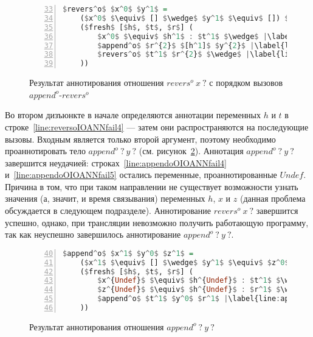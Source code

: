 \begin{figure}[h!]
  \begin{center}
  \begin{minipage}{0.35\textwidth}
  \begin{lstlisting}[language=Haskell, frame=single, numbers=left,numberstyle=\small, firstnumber=33, escapechar=|]
  $revers^o$ $x^0$ $y^1$ =
    ($x^0$ $\equiv$ [] $\wedge$ $y^1$ $\equiv$ []) $\vee$ |\label{line:reversoIOANNfail2}|
    ($fresh$ [$h$, $t$, $r$] (
        $x^0$ $\equiv$ $h^1$ : $t^1$ $\wedge$ |\label{line:reversoIOANNfail4}|
        $append^o$ $r^{2}$ $[h^1]$ $y^{2}$ |\label{line:reversoIOANNfail5}|
        $revers^o$ $t^1$ $r^{2}$ $\wedge$ |\label{line:reversoIOANNfail6}|
    ))
    \end{lstlisting}
  \end{minipage}
  \end{center}
  \caption{Результат аннотирования отношения $revers^o \ x \ ?$ с порядком вызовов $append^o$-$revers^o$}
  \label{lst:reversoIOANNfail}
\end{figure}

Во втором дизъюнкте в начале определяются аннотации переменных $h$ и $t$ в строке~\ref{line:reversoIOANNfail4} --- затем они распространяются на последующие вызовы.
Входным является только второй аргумент, поэтому необходимо проаннотировать тело $append^o \ ? \ y \ ?$ (см. рисунок~\ref{lst:appendoOIOANNfail}).
Аннотация $append^o \ ? \ y \ ?$ завершится неудачией: строках~\ref{line:appendoOIOANNfail4} и~\ref{line:appendoOIOANNfail5} остались переменные, проаннотированные $Undef$.
Причина в том, что при таком направлении не существует возможности узнать значения (а, значит, и время связывания) переменных $h$, $x$ и $z$ (данная проблема обсуждается в следующем подразделе).
Аннотирование $revers^o \ x \ ?$ завершится успешно, однако, при трансляции невозможно получить работающую программу, так как неуспешно завершилось аннотирование $append^o \ ? \ y \ ?$.

\begin{figure}[h!]
  \begin{center}
  \begin{minipage}{0.40\textwidth}
  \begin{lstlisting}[language=Haskell, frame=single, numbers=left,numberstyle=\small, firstnumber=40, escapechar=|]
  $append^o$ $x^1$ $y^0$ $z^1$ =
    ($x^1$ $\equiv$ [] $\wedge$ $y^1$ $\equiv$ $z^0$) $\vee$ |\label{line:appendoOIOANNfail2}|
    ($fresh$ [$h$, $t$, $r$] (
        $x^{Undef}$ $\equiv$ $h^{Undef}$ : $t^1$ $\wedge$ |\label{line:appendoOIOANNfail4}|
        $z^{Undef}$ $\equiv$ $h^{Undef}$ : $r^1$ $\wedge$ |\label{line:appendoOIOANNfail5}|
        $append^o$ $t^1$ $y^0$ $r^1$ |\label{line:appendoOIOANNfail6}|
    ))
    \end{lstlisting}
  \end{minipage}
  \end{center}
  \caption{Результат аннотирования отношения $append^o \ ? \ y \ ?$}
  \label{lst:appendoOIOANNfail}
\end{figure}

